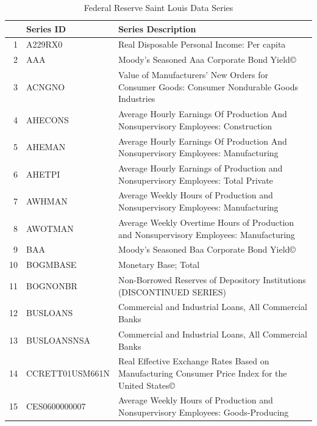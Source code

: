 \documentclass[12pt]{article}
\begin{document}
\begin{table}[ht]
\caption{Federal Reserve Saint Louis Data Series}
\label{fred data}
\centering
\begin{tabular}{r|p{4cm}p{11cm}}
  \hline
  & Series ID & Series Description \\ 
  \hline
	1 & A229RX0 & Real Disposable Personal Income: Per capita \\ 
	\hline
	2 & AAA & Moody's Seasoned Aaa Corporate Bond Yield© \\ 
	\hline
	3 & ACNGNO & Value of Manufacturers' New Orders for Consumer Goods: Consumer Nondurable Goods Industries \\ 
	\hline
	4 & AHECONS & Average Hourly Earnings Of Production And Nonsupervisory Employees: Construction \\ 
	\hline
	5 & AHEMAN & Average Hourly Earnings Of Production And Nonsupervisory Employees: Manufacturing \\ 
	\hline
	  6 & AHETPI & Average Hourly Earnings of Production and Nonsupervisory Employees: Total Private \\ 
	\hline
	7 & AWHMAN & Average Weekly Hours of Production and Nonsupervisory Employees: Manufacturing \\ 
	\hline
	8 & AWOTMAN & Average Weekly Overtime Hours of Production and Nonsupervisory Employees: Manufacturing \\ 
	\hline
	9 & BAA & Moody's Seasoned Baa Corporate Bond Yield© \\ 
	\hline
    10 & BOGMBASE & Monetary Base; Total \\ 
    \hline
	11 & BOGNONBR & Non-Borrowed Reserves of Depository Institutions (DISCONTINUED SERIES) \\ 
	\hline
	12 & BUSLOANS & Commercial and Industrial Loans, All Commercial Banks \\ 
	\hline
	13 & BUSLOANSNSA & Commercial and Industrial Loans, All Commercial Banks \\ 
	\hline
	14 & CCRETT01USM661N & Real Effective Exchange Rates Based on Manufacturing Consumer Price Index for the United States© \\ 
	\hline
	15 & CES0600000007 & Average Weekly Hours of Production and Nonsupervisory Employees: Goods-Producing \\ 
	\hline

\end{tabular}
\end{table}
\end{document}
